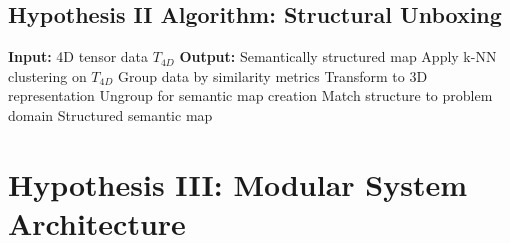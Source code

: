 \documentclass[11pt,a4paper]{article}
\begin{document}
\subsection{Hypothesis II Algorithm: Structural Unboxing}

\begin{algorithm}[H]
\caption{Data Structure Unboxing}
\begin{algorithmic}[1]
    \STATE \textbf{Input:} 4D tensor data $T_{4D}$
    \STATE \textbf{Output:} Semantically structured map
    \STATE Apply k-NN clustering on $T_{4D}$
    \STATE Group data by similarity metrics
    \STATE Transform to 3D representation
    \STATE Ungroup for semantic map creation
    \STATE Match structure to problem domain
    \RETURN Structured semantic map
\end{algorithmic}
\end{algorithm}

\section{Hypothesis III: Modular System Architecture}
\end{document}
